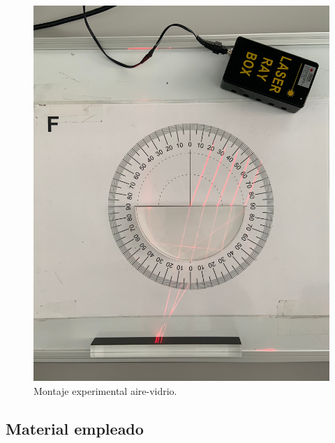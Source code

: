 \documentclass[a4paper,twocolumn]{article}
\begin{document}
        
        \begin{figure}[h!]
            \centering
            \includegraphics[width = 0.9\linewidth]{Fotos/Montaje experimental vidrio.jpg}
            \caption{Montaje experimental aire-vidrio.}
            \label{fig:MonExpAirVid}
        \end{figure}

        \subsection{Material empleado}
        
        
\end{document}
